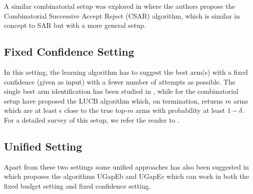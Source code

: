     A similar combinatorial setup was explored in \citet{chen2014combinatorial} where the authors propose the Combinatorial Successive Accept Reject (CSAR) algorithm, which is similar in concept to SAR but with a more general setup. 

 
\subsection{Fixed Confidence Setting} 

In this setting, the learning algorithm has to suggest the best arm(s) with a fixed confidence (given as input) with a fewer number of attempts as possible. The single best arm identification has been studied in \citet{even2006action}, while for the combinatorial setup \citet{kalyanakrishnan2012pac} have proposed the LUCB algorithm which, on termination, returns  $m$ arms which are at least $\epsilon$ close to the true top-$m$ arms with probability at least $1-\delta$. For a detailed survey of this setup, we refer the reader to \citet{jamieson2014best}. 

\subsection{Unified Setting}
Apart from these two settings some unified approaches has also been suggested in \citet{gabillon2012best} which proposes the algorithms UGapEb and UGapEc which can work in both the fixed budget setting and fixed confidence setting. 



    
    
